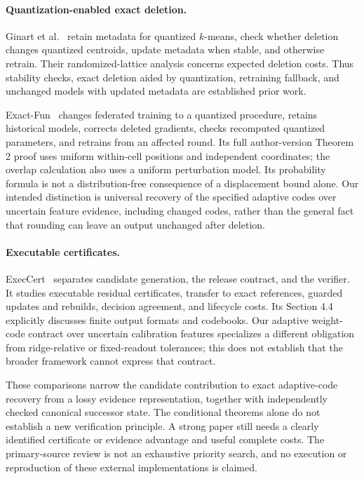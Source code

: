 \documentclass[10pt,twocolumn,letterpaper]{article}
\begin{document}
\paragraph{Quantization-enabled exact deletion.}
Ginart et al.~\cite{ginart} retain metadata for quantized $k$-means, check whether
deletion changes quantized centroids, update metadata when stable, and otherwise
retrain. Their randomized-lattice analysis concerns expected deletion costs.
Thus stability checks, exact deletion aided by quantization, retraining fallback,
and unchanged models with updated metadata are established prior work.

Exact-Fun~\cite{exactfun} changes federated training to a quantized procedure,
retains historical models, corrects deleted gradients, checks recomputed
quantized parameters, and retrains from an affected round. Its full author-version
Theorem 2 proof uses uniform within-cell positions and independent coordinates;
the overlap calculation also uses a uniform perturbation model. Its probability
formula is not a distribution-free consequence of a displacement bound alone.
Our intended distinction is universal recovery of the specified adaptive codes
over uncertain feature evidence, including changed codes, rather than the
general fact that rounding can leave an output unchanged after deletion.

\paragraph{Executable certificates.}
ExecCert~\cite{execcert} separates candidate generation, the release contract, and
the verifier. It studies executable residual certificates, transfer to exact
references, guarded updates and rebuilds, decision agreement, and lifecycle costs.
Its Section 4.4 explicitly discusses finite output formats and codebooks. Our
adaptive weight-code contract over uncertain calibration features specializes a
different obligation from ridge-relative or fixed-readout tolerances; this does
not establish that the broader framework cannot express that contract.

These comparisons narrow the candidate contribution to exact adaptive-code
recovery from a lossy evidence representation, together with independently
checked canonical successor state. The conditional theorems alone do not
establish a new verification principle. A strong paper still needs a clearly
identified certificate or evidence advantage and useful complete costs. The
primary-source review is not an exhaustive priority search, and no execution or
reproduction of these external implementations is claimed.
\end{document}
